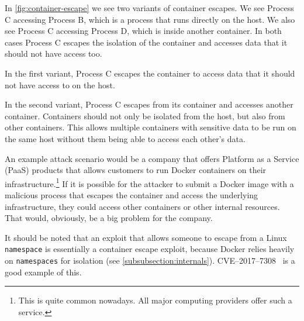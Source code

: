 In \autoref{fig:container-escape} we see two variants of container escapes. We see Process C accessing Process B, which is a process that runs directly on the host. We also see Process C accessing Process D, which is inside another container. In both cases Process C escapes the isolation of the container and accesses data that it should not have access too.

In the first variant, Process C escapes the container to access data that it should not have access to on the host.

In the second variant, Process C escapes from its container and accesses another container. Containers should not only be isolated from the host, but also from other containers. This allows multiple containers with sensitive data to be run on the same host without them being able to access each other's data.


\medskip

An example attack scenario would be a company that offers Platform as a Service (PaaS) products that allows customers to run Docker containers on their infrastructure.\footnote{This is quite common nowadays. All major computing providers offer such a service.} If it is possible for the attacker to submit a Docker image with a malicious process that escapes the container and access the underlying infrastructure, they could access other containers or other internal resources. That would, obviously, be a big problem for the company.

\medskip

It should be noted that an exploit that allows someone to escape from a Linux \lstinline{namespace} is essentially a container escape exploit, because Docker relies heavily on \lstinline{namespaces} for isolation (see \autoref{subsubsection:internals}). CVE--2017--7308~\cite{CVE-2017-7308} is a good example of this.
